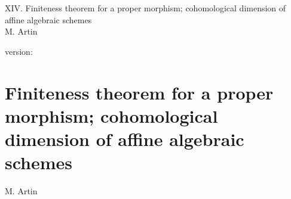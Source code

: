 \documentclass[10pt]{../fichiers-configuration-latex/smfart}
\begin{document}
\begin{center}
XIV. Finiteness theorem for a proper morphism; cohomological dimension of affine algebraic schemes\\
M. Artin
\end{center}

version: \showgitstatus
\tableofcontents

\else
\chapter[Proper finiteness and affine cohomological dimension]{Finiteness theorem for a proper morphism; cohomological dimension of affine algebraic schemes}
\begin{center}
M. Artin
\end{center}
\fi
{}\label{sga4.exp.XIV}










\end{document}
